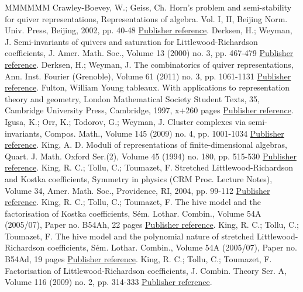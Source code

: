 \documentclass[11pt]{article}
\theoremstyle{definition}
\numberwithin{equation}{section}
\begin{document}
\begin{thebibliography}{MMMMMM}
 Crawley-Boevey, W.; Geiss, Ch. Horn’s problem and semi-stability for quiver representations, Representations of algebra. Vol. I, II, Beijing Norm. Univ. Press, Beijing, 2002, pp. 40-48 \href{https://alco.centre-mersenne.org/articles/10.5802/alco.398/#CB}{Publisher reference}.
 Derksen, H.; Weyman, J. Semi-invariants of quivers and saturation for Littlewood-Richardson coefficients, J. Amer. Math. Soc., Volume 13 (2000) no. 3, pp. 467-479 \href{https://alco.centre-mersenne.org/articles/10.5802/alco.398/#DW1}{Publisher reference}.
 Derksen, H.; Weyman, J. The combinatorics of quiver representations, Ann. Inst. Fourier (Grenoble), Volume 61 (2011) no. 3, pp. 1061-1131 \href{https://alco.centre-mersenne.org/articles/10.5802/alco.398/#DW2}{Publisher reference}.
 Fulton, William Young tableaux. With applications to representation theory and geometry, London Mathematical Society Student Texts, 35, Cambridge University Press, Cambridge, 1997, x+260 pages \href{https://alco.centre-mersenne.org/articles/10.5802/alco.398/#F3}{Publisher reference}.
 Igusa, K.; Orr, K.; Todorov, G.; Weyman, J. Cluster complexes via semi-invariants, Compos. Math., Volume 145 (2009) no. 4, pp. 1001-1034 \href{https://alco.centre-mersenne.org/articles/10.5802/alco.398/#IOTW}{Publisher reference}.
 King, A. D. Moduli of representations of finite-dimensional algebras, Quart. J. Math. Oxford Ser.(2), Volume 45 (1994) no. 180, pp. 515-530 \href{https://alco.centre-mersenne.org/articles/10.5802/alco.398/#K}{Publisher reference}.
 King, R. C.; Tollu, C.; Toumazet, F. Stretched Littlewood-Richardson and Kostka coefficients, Symmetry in physics (CRM Proc. Lecture Notes), Volume 34, Amer. Math. Soc., Providence, RI, 2004, pp. 99-112 \href{https://alco.centre-mersenne.org/articles/10.5802/alco.398/#KTT}{Publisher reference}.
 King, R. C.; Tollu, C.; Toumazet, F. The hive model and the factorisation of Kostka coefficients, Sém. Lothar. Combin., Volume 54A (2005/07), Paper no. B54Ah, 22 pages \href{https://alco.centre-mersenne.org/articles/10.5802/alco.398/#KTT2}{Publisher reference}.
 King, R. C.; Tollu, C.; Toumazet, F. The hive model and the polynomial nature of stretched Littlewood-Richardson coefficients, Sém. Lothar. Combin., Volume 54A (2005/07), Paper no. B54Ad, 19 pages \href{https://alco.centre-mersenne.org/articles/10.5802/alco.398/#KTT3}{Publisher reference}.
 King, R. C.; Tollu, C.; Toumazet, F. Factorisation of Littlewood-Richardson coefficients, J. Combin. Theory Ser. A, Volume 116 (2009) no. 2, pp. 314-333 \href{https://alco.centre-mersenne.org/articles/10.5802/alco.398/#KTT4}{Publisher reference}.

\end{thebibliography}
\end{document}
